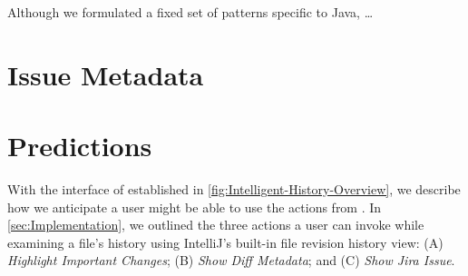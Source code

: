 Although we formulated a fixed set of patterns specific to Java, \dots {}

\section{Issue Metadata}
\label{sec:Issue-Metadata}


\section{Predictions}
\label{sec:Predictions}

With the interface of  established in \autoref{fig:Intelligent-History-Overview}, we describe how we anticipate a user might be able to use the actions from . 
In \autoref{sec:Implementation}, we outlined the three actions a user can invoke while examining a file's history using IntelliJ's built-in file revision history view: (A) \textit{Highlight Important Changes}; (B) \textit{Show Diff Metadata}; and (C) \textit{Show Jira Issue}.

\endinput

Any text after an \endinput is ignored.
You could put scraps here or things in progress.